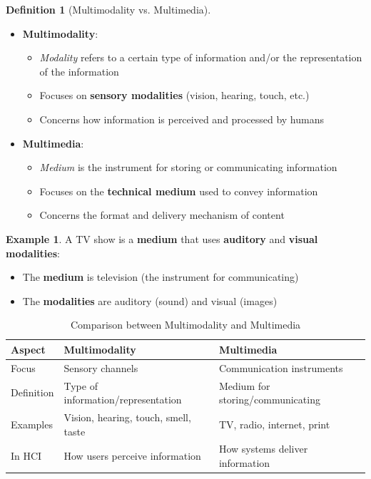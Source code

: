 \documentclass[11pt,a4paper]{article}
\theoremstyle{definition}
\newtheorem{definition}{Definition}[section]
\newtheorem{example}{Example}[section]
\theoremstyle{plain}
\theoremstyle{remark}
\begin{document}
\begin{definition}[Multimodality vs. Multimedia]
\begin{itemize}
    \item \textbf{Multimodality}:
    \begin{itemize}
        \item \textit{Modality} refers to a certain type of information and/or the representation of the information
        \item Focuses on \textbf{sensory modalities} (vision, hearing, touch, etc.)
        \item Concerns how information is perceived and processed by humans
    \end{itemize}
    
    \item \textbf{Multimedia}:
    \begin{itemize}
        \item \textit{Medium} is the instrument for storing or communicating information
        \item Focuses on the \textbf{technical medium} used to convey information
        \item Concerns the format and delivery mechanism of content
    \end{itemize}
\end{itemize}
\end{definition}

\begin{example}
A TV show is a \textbf{medium} that uses \textbf{auditory} and \textbf{visual modalities}:
\begin{itemize}
    \item The \textbf{medium} is television (the instrument for communicating)
    \item The \textbf{modalities} are auditory (sound) and visual (images)
\end{itemize}
\end{example}

\begin{table}[h]
\centering
\begin{tabular}{|l|p{5cm}|p{5cm}|}
\hline
\textbf{Aspect} & \textbf{Multimodality} & \textbf{Multimedia} \\
\hline
Focus & Sensory channels & Communication instruments \\
\hline
Definition & Type of information/representation & Medium for storing/communicating \\
\hline
Examples & Vision, hearing, touch, smell, taste & TV, radio, internet, print \\
\hline
In HCI & How users perceive information & How systems deliver information \\
\hline
\end{tabular}
\caption{Comparison between Multimodality and Multimedia}
\end{table}
\end{document}
